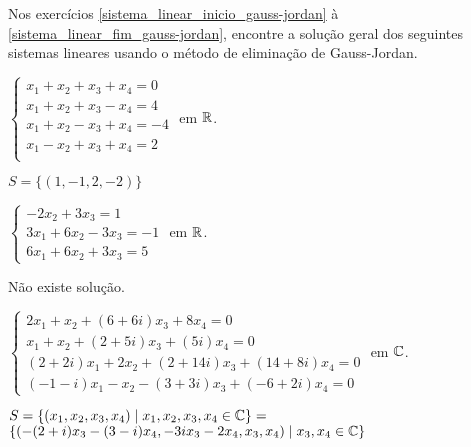 \documentclass[12pt]{exam}
\begin{document}
Nos exercícios \ref{sistema_linear_inicio_gauss-jordan} à \ref{sistema_linear_fim_gauss-jordan}, encontre a solução geral dos seguintes sistemas lineares usando o método de eliminação de Gauss-Jordan.

\begin{exercicio}\label{sistema_linear_inicio_gauss-jordan}
  $
    \begin{cases}
      x_1 + x_2 + x_3 + x_4 = 0\\
      x_1 + x_2 + x_3 - x_4 = 4\\
      x_1 + x_2 - x_3 + x_4 = -4\\
      x_1 - x_2 + x_3 + x_4 = 2\\
    \end{cases}
  $
  em $\mathbb{R}$.
  \begin{solucao}
    $S = \{(1, -1, 2, -2)\}$
  \end{solucao}
\end{exercicio}

\begin{exercicio}
  $
    \begin{cases}
      -2x_2 + 3x_3 = 1\\
      3x_1 + 6x_2 - 3x_3 = -1\\
      6x_1 + 6x_2 + 3x_3 = 5
    \end{cases}
  $
  em $\mathbb{R}$.
  \begin{solucao}
    Não existe solução.
  \end{solucao}
\end{exercicio}

\begin{exercicio}
  $
    \begin{cases}
      2x_1 + x_2 + (6 + 6i)x_3 + 8x_4 = 0\\
      x_1 + x_2 + (2 + 5i)x_3 + (5  i)x_4 = 0\\
      (2 + 2i)x_1 + 2x_2 + (2 + 14i)x_3 + (14 + 8i)x_4 =0\\
      (-1 - i)x_1 - x_2 - (3 + 3i)x_3 + (-6 + 2i)x_4 = 0
    \end{cases}
  $
  em $\mathbb{C}$.
  \begin{solucao}
    $S = \{(x_1, x_2, x_3, x_4) \mid x_1, x_2, x_3, x_4 \in \mathbb{C}\} = $\\ $\{(-(2 + i)x_3 - (3 - i)x_4,-3ix_3 - 2x_4, x_3, x_4) \mid x_3, x_4 \in \mathbb{C}\}$
  \end{solucao}
\end{exercicio}
\end{document}
